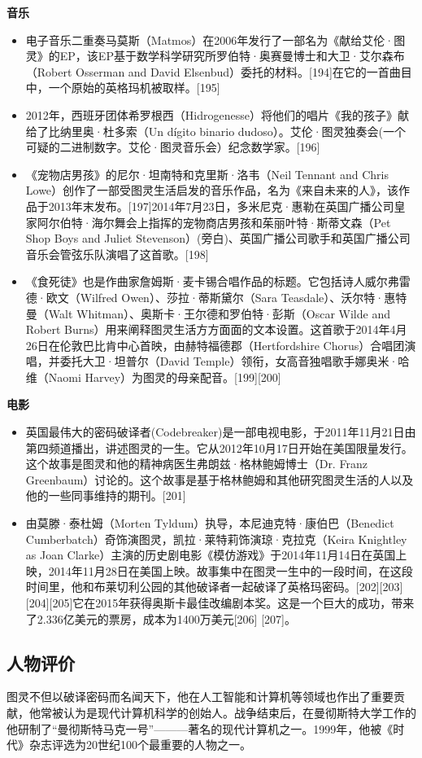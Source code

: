 \textbf{音乐}
\begin{itemize}
\item 电子音乐二重奏马莫斯（Matmos）在2006年发行了一部名为《献给艾伦·图灵》的EP，该EP基于数学科学研究所罗伯特·奥赛曼博士和大卫·艾尔森布（Robert Osserman and David Elsenbud）委托的材料。[194]在它的一首曲目中，一个原始的英格玛机被取样。[195]
\item 2012年，西班牙团体希罗根西（Hidrogenesse）将他们的唱片《我的孩子》献给了比纳里奥·杜多索（Un dígito binario dudoso）。艾伦·图灵独奏会(一个可疑的二进制数字。艾伦·图灵音乐会）纪念数学家。[196]
\item 《宠物店男孩》的尼尔·坦南特和克里斯·洛韦（Neil Tennant and Chris Lowe）创作了一部受图灵生活启发的音乐作品，名为《来自未来的人》，该作品于2013年末发布。[197]2014年7月23日，多米尼克·惠勒在英国广播公司皇家阿尔伯特·海尔舞会上指挥的宠物商店男孩和茱丽叶特·斯蒂文森（Pet Shop Boys and Juliet Stevenson）(旁白)、英国广播公司歌手和英国广播公司音乐会管弦乐队演唱了这首歌。[198]
\item 《食死徒》也是作曲家詹姆斯·麦卡锡合唱作品的标题。它包括诗人威尔弗雷德·欧文（Wilfred Owen）、莎拉·蒂斯黛尔（Sara Teasdale）、沃尔特·惠特曼（Walt Whitman）、奥斯卡·王尔德和罗伯特·彭斯（Oscar Wilde and Robert Burns）用来阐释图灵生活方方面面的文本设置。这首歌于2014年4月26日在伦敦巴比肯中心首映，由赫特福德郡（Hertfordshire Chorus）合唱团演唱，并委托大卫·坦普尔（David Temple）领衔，女高音独唱歌手娜奥米·哈维（Naomi Harvey）为图灵的母亲配音。[199][200]
\end{itemize}

\textbf{电影}
\begin{itemize}
\item 英国最伟大的密码破译者(Codebreaker)是一部电视电影，于2011年11月21日由第四频道播出，讲述图灵的一生。它从2012年10月17日开始在美国限量发行。这个故事是图灵和他的精神病医生弗朗兹·格林鲍姆博士（Dr. Franz Greenbaum）讨论的。这个故事是基于格林鲍姆和其他研究图灵生活的人以及他的一些同事维持的期刊。[201]
\item 由莫滕·泰杜姆（Morten Tyldum）执导，本尼迪克特·康伯巴（Benedict Cumberbatch）奇饰演图灵，凯拉·莱特莉饰演琼·克拉克（Keira Knightley as Joan Clarke）主演的历史剧电影《模仿游戏》于2014年11月14日在英国上映，2014年11月28日在美国上映。故事集中在图灵一生中的一段时间，在这段时间里，他和布莱切利公园的其他破译者一起破译了英格玛密码。[202][203][204][205]它在2015年获得奥斯卡最佳改编剧本奖。这是一个巨大的成功，带来了2.336亿美元的票房，成本为1400万美元[206] [207]。
\end{itemize}

\subsection{人物评价}
图灵不但以破译密码而名闻天下，他在人工智能和计算机等领域也作出了重要贡献，他常被认为是现代计算机科学的创始人。战争结束后，在曼彻斯特大学工作的他研制了“曼彻斯特马克一号”———著名的现代计算机之一。1999年，他被《时代》杂志评选为20世纪100个最重要的人物之一。

